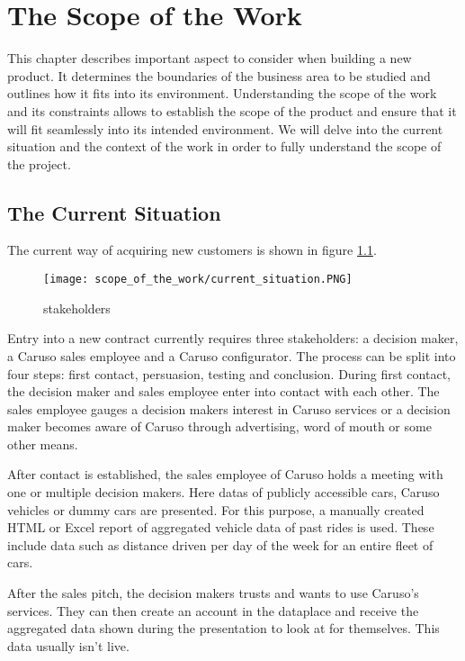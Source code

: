 \chapter{The Scope of the Work}

This chapter describes important aspect to consider when building a new product. It determines the boundaries of the business area to be studied and outlines how it fits into its environment. Understanding the scope of the work and its constraints allows to establish the scope of the product and ensure that it will fit seamlessly into its intended environment. We will delve into the current situation and the context of the work in order to fully understand the scope of the project.

\section{The Current Situation}
The current way of acquiring new customers is shown in figure \ref{ScopeOfWork:Situation}.
\begin{figure}[ht]
  \centering
  \texttt{[image: scope\_of\_the\_work/current\_situation.PNG]}
  \caption{\Glspl{stakeholder}}
  \label{ScopeOfWork:Situation}
\end{figure}

Entry into a new contract currently requires three \glspl{stakeholder}: a decision maker, a Caruso sales employee and a Caruso configurator. The process can be split into four steps: first contact, persuasion, testing and conclusion. During first contact, the decision maker and sales employee enter into contact with each other. The sales employee gauges a decision makers interest in Caruso services or a decision maker becomes aware of Caruso through advertising, word of mouth or some other means.

After contact is established, the sales employee of Caruso holds a meeting with one or multiple decision makers. Here \glspl{data} of publicly accessible cars, Caruso vehicles or dummy cars are presented. For this purpose, a manually created HTML or Excel report of aggregated vehicle data of past rides is used. These include data such as distance driven per day of the week for an entire fleet of cars.

After the sales pitch, the decision makers trusts and wants to use Caruso's services. They can then create an account in the \gls{dataplace} and receive the aggregated data shown during the presentation to look at for themselves. This data usually isn't live.

